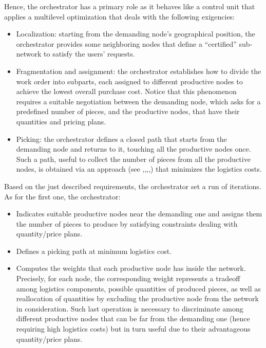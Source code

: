 Hence, the orchestrator has a primary role as it behaves like a control unit that applies a multilevel optimization that deals with the following exigencies:
\begin{itemize}
    \item Localization: starting from the demanding node’s geographical position, the orchestrator provides some neighboring nodes that define a “certified” sub-network to satisfy the users’ requests.
    \item Fragmentation and assignment: the orchestrator establishes how to divide the work order into subparts, each assigned to different productive nodes to achieve the lowest overall purchase cost. Notice that this phenomenon requires a suitable negotiation between the demanding node, which asks for a predefined number of pieces, and the productive nodes, that have their quantities and pricing plans.
    \item Picking: the orchestrator defines a closed path that starts from the demanding node and returns to it, touching all the productive nodes once. Such a path, useful to collect the number of pieces from all the productive nodes, is obtained via an approach (see \textcite{karp_patching_1979},\textcite{gutin_traveling_2002},\textcite{traveling_salesman_comp_study},\textcite{gutin2006traveling},\textcite{wang_towards_2016}) that minimizes the logistics costs.
\end{itemize}

Based on the just described requirements, the orchestrator set a run of iterations. As for the first one, the orchestrator:

\begin{itemize}
    \item Indicates suitable productive nodes near the demanding one and assigns them the number of pieces to produce by satisfying constraints dealing with quantity/price plans.
    \item Defines a picking path at minimum logistics cost.
    \item Computes the weights that each productive node has inside the
network. Precisely, for each node, the corresponding weight represents a tradeoff among logistics components, possible quantities of produced pieces, as well as reallocation of quantities by excluding the productive node from the network in consideration. Such last operation is necessary to discriminate among different productive nodes that can be far from the demanding one (hence requiring high logistics costs) but in turn useful due to their advantageous quantity/price plans.
\end{itemize}

